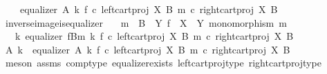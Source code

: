 \begin{isabellebody}
\ \ \ \ equalizer\ A\ k\ {\isacharparenleft}{\kern0pt}f\ {\isasymcirc}\isactrlsub c\ left{\isacharunderscore}{\kern0pt}cart{\isacharunderscore}{\kern0pt}proj\ X\ B{\isacharparenright}{\kern0pt}\ {\isacharparenleft}{\kern0pt}m\ {\isasymcirc}\isactrlsub c\ right{\isacharunderscore}{\kern0pt}cart{\isacharunderscore}{\kern0pt}proj\ X\ B{\isacharparenright}{\kern0pt}{\isacharparenright}{\kern0pt}{\isachardoublequoteclose}\isanewline
\isanewline
{}\isamarkupfalse%
\ inverse{\isacharunderscore}{\kern0pt}image{\isacharunderscore}{\kern0pt}is{\isacharunderscore}{\kern0pt}equalizer{\isacharcolon}{\kern0pt}\isanewline
\ \ \ {\isachardoublequoteopen}m\ {\isacharcolon}{\kern0pt}\ B\ {\isasymrightarrow}\ Y{\isachardoublequoteclose}\ {\isachardoublequoteopen}f\ {\isacharcolon}{\kern0pt}\ X\ {\isasymrightarrow}\ Y{\isachardoublequoteclose}\ {\isachardoublequoteopen}monomorphism\ m{\isachardoublequoteclose}\isanewline
\ \ \ {\isachardoublequoteopen}{\isasymexists}k{\isachardot}{\kern0pt}\ equalizer\ {\isacharparenleft}{\kern0pt}f\isactrlsup {\isacharminus}{\kern0pt}B{\isasymrparr}\isactrlbsub m\isactrlesub {\isacharparenright}{\kern0pt}\ k\ {\isacharparenleft}{\kern0pt}f\ {\isasymcirc}\isactrlsub c\ left{\isacharunderscore}{\kern0pt}cart{\isacharunderscore}{\kern0pt}proj\ X\ B{\isacharparenright}{\kern0pt}\ {\isacharparenleft}{\kern0pt}m\ {\isasymcirc}\isactrlsub c\ right{\isacharunderscore}{\kern0pt}cart{\isacharunderscore}{\kern0pt}proj\ X\ B{\isacharparenright}{\kern0pt}{\isachardoublequoteclose}\isanewline
%
\isadelimproof
%
\endisadelimproof
%
\isatagproof
{}\isamarkupfalse%
\ {\isacharminus}{\kern0pt}\isanewline
\ \ \isamarkupfalse%
\ A\ k\ \ {\isachardoublequoteopen}equalizer\ A\ k\ {\isacharparenleft}{\kern0pt}f\ {\isasymcirc}\isactrlsub c\ left{\isacharunderscore}{\kern0pt}cart{\isacharunderscore}{\kern0pt}proj\ X\ B{\isacharparenright}{\kern0pt}\ {\isacharparenleft}{\kern0pt}m\ {\isasymcirc}\isactrlsub c\ right{\isacharunderscore}{\kern0pt}cart{\isacharunderscore}{\kern0pt}proj\ X\ B{\isacharparenright}{\kern0pt}{\isachardoublequoteclose}\isanewline
\ \ \ \ \isamarkupfalse%
\ {\isacharparenleft}{\kern0pt}meson\ assms{\isacharparenleft}{\kern0pt}{}{\isacharcomma}{\kern0pt}{}{\isacharparenright}{\kern0pt}\ comp{\isacharunderscore}{\kern0pt}type\ equalizer{\isacharunderscore}{\kern0pt}exists\ left{\isacharunderscore}{\kern0pt}cart{\isacharunderscore}{\kern0pt}proj{\isacharunderscore}{\kern0pt}type\ right{\isacharunderscore}{\kern0pt}cart{\isacharunderscore}{\kern0pt}proj{\isacharunderscore}{\kern0pt}type{\isacharparenright}{\kern0pt}\isanewline

\end{isabellebody}
